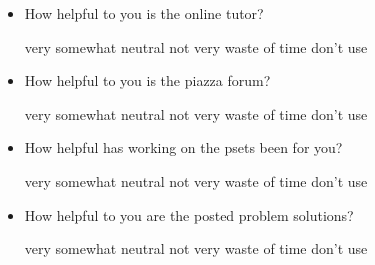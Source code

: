 \documentclass[handout]{mcs}
\begin{document}
\begin{itemize}
\begin{itemize}
\item How helpful to you is the online tutor?

\begin{center}
very\hspace{0.3in} somewhat \hspace{0.3in} neutral\hspace{0.3in} not
very \hspace{0.3in} waste of time  \hspace{0.7in}don't use
\end{center}

\item How helpful to you is the piazza forum?

\begin{center}
very\hspace{0.3in} somewhat \hspace{0.3in} neutral\hspace{0.3in} not
very \hspace{0.3in} waste of time  \hspace{0.7in}don't use
\end{center}

\newpage

\item How helpful has working on the psets been for you?
 
\begin{center}
very\hspace{0.3in} somewhat \hspace{0.3in} neutral\hspace{0.3in} not
very \hspace{0.3in} waste of time  \hspace{0.7in}don't use
\end{center}

\item How helpful to you are the posted problem solutions?
 
\begin{center}
very\hspace{0.3in} somewhat \hspace{0.3in} neutral\hspace{0.3in} not
very \hspace{0.3in} waste of time  \hspace{0.7in}don't use
\end{center}

\iffalse
\begin{center}
very well\hspace{0.3in} mostly\hspace{0.3in} adequately\hspace{0.3in}
partially\hspace{0.3in} poorly  \hspace{0.7in} don't use
\end{center}
\fi


\end{itemize}
\end{itemize}
\end{document}
